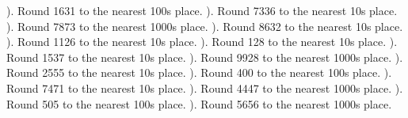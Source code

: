 \documentclass{article}%
\begin{document}
). Round 1631 to the nearest 100s place.%
\newline%
\newline%
). Round 7336 to the nearest 10s place.%
\newline%
\newline%
). Round 7873 to the nearest 1000s place.%
\newline%
\newline%
). Round 8632 to the nearest 10s place.%
\newline%
\newline%
). Round 1126 to the nearest 10s place.%
\newline%
\newline%
). Round 128 to the nearest 10s place.%
\newline%
\newline%
). Round 1537 to the nearest 10s place.%
\newline%
\newline%
). Round 9928 to the nearest 1000s place.%
\newline%
\newline%
). Round 2555 to the nearest 10s place.%
\newline%
\newline%
). Round 400 to the nearest 100s place.%
\newline%
\newline%
). Round 7471 to the nearest 10s place.%
\newline%
\newline%
). Round 4447 to the nearest 1000s place.%
\newline%
\newline%
). Round 505 to the nearest 100s place.%
\newline%
\newline%
). Round 5656 to the nearest 1000s place.%
\end{document}
